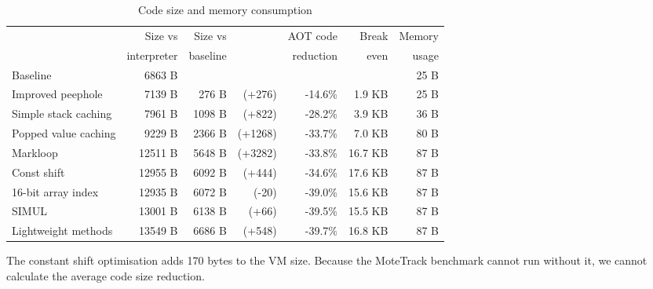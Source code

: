 \begin{table}
\centering
\caption{Code size and memory consumption}
\label{tbl-code-size-and-memory-consumption}
    \begin{threeparttable}
    \begin{tabular}{lrrrrrr} %
    \toprule
                              & Size vs     & Size vs  &                      & AOT code  &   Break & Memory    \\
                              & interpreter & baseline &                      & reduction &   even  & usage     \\
    \midrule
    \midrule
    Baseline                  &     6863 B  &          &                      &           &         & 25 B      \\
    Improved peephole         &     7139 B  &   276 B  & \scriptsize   (+276) &  -14.6\%  &  1.9 KB & 25 B      \\
    Simple stack caching      &     7961 B  &  1098 B  & \scriptsize   (+822) &  -28.2\%  &  3.9 KB & 36 B      \\
    Popped value caching      &     9229 B  &  2366 B  & \scriptsize  (+1268) &  -33.7\%  &  7.0 KB & 80 B      \\
    Markloop                  &    12511 B  &  5648 B  & \scriptsize  (+3282) &  -33.8\%  & 16.7 KB & 87 B      \\
    Const shift               &    12955 B  &  6092 B  & \scriptsize   (+444) &  -34.6\%  & 17.6 KB & 87 B      \\
    16-bit array index        &    12935 B  &  6072 B  & \scriptsize    (-20) &  -39.0\%  & 15.6 KB & 87 B      \\
    SIMUL                     &    13001 B  &  6138 B  & \scriptsize    (+66) &  -39.5\%  & 15.5 KB & 87 B      \\
    Lightweight methods       &    13549 B  &  6686 B  & \scriptsize   (+548) &  -39.7\%  & 16.8 KB & 87 B      \\
    \bottomrule
    \end{tabular}
    \begin{tablenotes}
        \item The constant shift optimisation adds 170 bytes to the VM size. Because the MoteTrack benchmark cannot run without it, we cannot calculate the average code size reduction.
    \end{tablenotes}
    \end{threeparttable}
\end{table}
